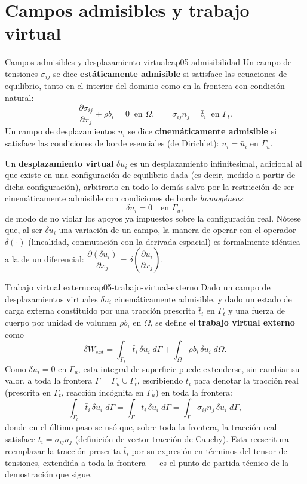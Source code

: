 \section{Campos admisibles y trabajo virtual}
\label{sec:cap05-admisibilidad}

\begin{definicion}{Campos admisibles y desplazamiento virtual}{cap05-admisibilidad}
Un campo de tensiones $\sigma_{ij}$ se dice \textbf{estáticamente admisible} si satisface las ecuaciones de equilibrio, tanto en el interior del dominio como en la frontera con condición natural:
\[
\frac{\partial \sigma_{ij}}{\partial x_j} + \rho b_i = 0 \ \text{ en } \Omega, \qquad \sigma_{ij}n_j = \bar t_i \ \text{ en } \Gamma_t .
\]
Un campo de desplazamientos $u_i$ se dice \textbf{cinemáticamente admisible} si satisface las condiciones de borde esenciales (de Dirichlet): $u_i = \bar u_i$ en $\Gamma_u$.

Un \textbf{desplazamiento virtual} $\delta u_i$ es un desplazamiento infinitesimal, adicional al que existe en una configuración de equilibrio dada (es decir, medido a partir de dicha configuración), arbitrario en todo lo demás salvo por la restricción de ser cinemáticamente admisible con condiciones de borde \emph{homogéneas}:
\[
\delta u_i = 0 \quad \text{en } \Gamma_u ,
\]
de modo de no violar los apoyos ya impuestos sobre la configuración real. Nótese que, al ser $\delta u_i$ una variación de un campo, la manera de operar con el operador $\delta(\cdot)$ (linealidad, conmutación con la derivada espacial) es formalmente idéntica a la de un diferencial: $\dfrac{\partial(\delta u_i)}{\partial x_j} = \delta\!\left(\dfrac{\partial u_i}{\partial x_j}\right)$.
\end{definicion}

\begin{definicion}{Trabajo virtual externo}{cap05-trabajo-virtual-externo}
Dado un campo de desplazamientos virtuales $\delta u_i$ cinemáticamente admisible, y dado un estado de carga externa constituido por una tracción prescrita $\bar t_i$ en $\Gamma_t$ y una fuerza de cuerpo por unidad de volumen $\rho b_i$ en $\Omega$, se define el \textbf{trabajo virtual externo} como
\[
\delta W_{ext} = \int_{\Gamma_t} \bar t_i\, \delta u_i \; d\Gamma + \int_\Omega \rho b_i\, \delta u_i \; d\Omega .
\]
Como $\delta u_i = 0$ en $\Gamma_u$, esta integral de superficie puede extenderse, sin cambiar su valor, a toda la frontera $\Gamma=\Gamma_u\cup\Gamma_t$, escribiendo $t_i$ para denotar la tracción real (prescrita en $\Gamma_t$, reacción incógnita en $\Gamma_u$) en toda la frontera:
\[
\int_{\Gamma_t} \bar t_i\, \delta u_i \; d\Gamma = \int_{\Gamma} t_i\, \delta u_i \; d\Gamma = \int_\Gamma \sigma_{ij}n_j\, \delta u_i \; d\Gamma ,
\]
donde en el último paso se usó que, sobre toda la frontera, la tracción real satisface $t_i=\sigma_{ij}n_j$ (definición de vector tracción de Cauchy). Esta reescritura --- reemplazar la tracción prescrita $\bar t_i$ por su expresión en términos del tensor de tensiones, extendida a toda la frontera --- es el punto de partida técnico de la demostración que sigue.
\end{definicion}

